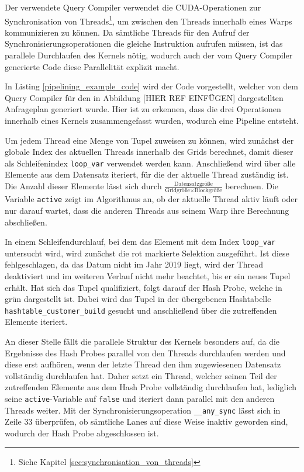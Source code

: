 Der verwendete Query Compiler verwendet die CUDA-Operationen zur Synchronisation von Threads\footnote{Siehe Kapitel \ref{sec:synchronisation_von_threads}}, um zwischen den Threads innerhalb eines Warps kommunizieren zu können.
Da sämtliche Threads für den Aufruf der Synchronisierungsoperationen die gleiche Instruktion aufrufen müssen, ist das parallele Durchlaufen des Kernels nötig, wodurch auch der vom Query Compiler generierte Code diese Parallelität explizit macht.

In Listing \ref{pipelining_example_code} wird der Code vorgestellt, welcher von dem Query Compiler für den in Abbildung [HIER REF EINFÜGEN] dargestellten Anfrageplan generiert wurde.
Hier ist zu erkennen, dass die drei Operationen innerhalb eines Kernels zusammengefasst wurden, wodurch eine Pipeline entsteht.

Um jedem Thread eine Menge von Tupel zuweisen zu können, wird zunächst der globale Index des aktuellen Threads innerhalb des Grids berechnet, damit dieser als Schleifenindex \texttt{loop\_var} verwendet werden kann.
Anschließend wird über alle Elemente aus dem Datensatz iteriert, für die der aktuelle Thread zuständig ist.
Die Anzahl dieser Elemente lässt sich durch $\frac{\text{Datensatzgröße}}{\text{Gridgröße} \times \text{Blockgröße}}$ berechnen.
Die Variable \texttt{active} zeigt im Algorithmus an, ob der aktuelle Thread aktiv läuft oder nur darauf wartet, dass die anderen Threads aus seinem Warp ihre Berechnung abschließen.

In einem Schleifendurchlauf, bei dem das Element mit dem Index \texttt{loop\_var} untersucht wird, wird zunächst die rot markierte Selektion ausgeführt.
Ist diese fehlgeschlagen, da das Datum nicht im Jahr 2019 liegt, wird der Thread deaktiviert und im weiteren Verlauf nicht mehr beachtet, bis er ein neues Tupel erhält.
Hat sich das Tupel qualifiziert, folgt darauf der Hash Probe, welche in grün dargestellt ist.
Dabei wird das Tupel in der übergebenen Hashtabelle \texttt{hashtable\_customer\_build} gesucht und anschließend über die zutreffenden Elemente iteriert.

An dieser Stelle fällt die parallele Struktur des Kernels besonders auf, da die Ergebnisse des Hash Probes parallel von den Threads durchlaufen werden und diese erst aufhören, wenn der letzte Thread den ihm zugewiesenen Datensatz vollständig durchlaufen hat.
Daher setzt ein Thread, welcher seinen Teil der zutreffenden Elemente aus dem Hash Probe vollständig durchlaufen hat, lediglich seine \texttt{active}-Variable auf \texttt{false} und iteriert dann parallel mit den anderen Threads weiter.
Mit der Synchronisierungsoperation \texttt{\_\_any\_sync} lässt sich in Zeile 33 überprüfen, ob sämtliche Lanes auf diese Weise inaktiv geworden sind, wodurch der Hash Probe abgeschlossen ist.

